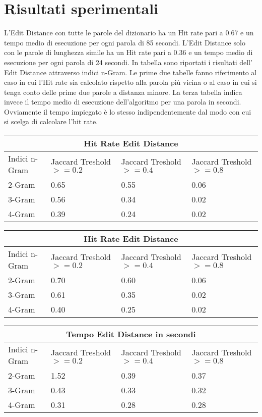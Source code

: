 \documentclass{article}
\begin{document}
\section{Risultati sperimentali}
L'Edit Distance con tutte le parole del dizionario ha un Hit rate pari a 0.67 e un tempo medio di esecuzione per ogni parola di 85 secondi. \newline
L'Edit Distance solo con le parole di lunghezza simile ha un Hit rate pari a 0.36 e un tempo medio di esecuzione per ogni parola di 24 secondi. \newline
 In tabella sono riportati i risultati dell' Edit Distance attraverso indici n-Gram. Le prime due tabelle fanno riferimento al caso in cui l'Hit rate sia calcolato rispetto alla parola più vicina o al caso in cui si tenga conto delle prime due parole a distanza minore. La terza tabella indica invece il tempo medio di esecuzione dell'algoritmo per una parola in secondi. Ovviamente il tempo impiegato è lo stesso indipendentemente dal modo con cui si scelga di calcolare l'hit rate.

\newpage

\begin{tabular}{ |p{3cm}||p{3cm}|p{3cm}|p{3cm}|  }
 \hline
 \multicolumn{4}{|c|}{Hit Rate Edit Distance} \\
 \hline
Indici n-Gram&Jaccard Treshold $>=0.2$ &Jaccard Treshold $>=0.4$&Jaccard Treshold $>=0.8$ \\
 \hline
 2-Gram   & 0.65    &0.55&   0.06\\
 3-Gram &   0.56  & 0.34   &0.02\\
 4-Gram &0.39 & 0.24&  0.02\\
 \hline
\end{tabular}

\medskip
\begin{tabular}{ |p{3cm}||p{3cm}|p{3cm}|p{3cm}|  }
 \hline
 \multicolumn{4}{|c|}{Hit Rate Edit Distance} \\
 \hline
Indici n-Gram&Jaccard Treshold $>=0.2$ &Jaccard Treshold $>=0.4$&Jaccard Treshold $>=0.8$ \\
 \hline
 2-Gram   & 0.70   &0.60&   0.06\\
 3-Gram &   0.61  & 0.35   &0.02\\
 4-Gram &0.40 & 0.25&  0.02\\
 \hline
\end{tabular}

\medskip 

\begin{tabular}{ |p{3cm}||p{3cm}|p{3cm}|p{3cm}|  }
 \hline
 \multicolumn{4}{|c|}{Tempo Edit Distance in secondi} \\
 \hline
Indici n-Gram&Jaccard Treshold $>=0.2$ &Jaccard Treshold $>=0.4$&Jaccard Treshold $>=0.8$ \\
 \hline
 2-Gram   & 1.52    &0.39&   0.37\\
 3-Gram &   0.43  & 0.33   &0.32\\
 4-Gram &0.31 & 0.28&  0.28\\
 \hline
\end{tabular}
\end{document}
